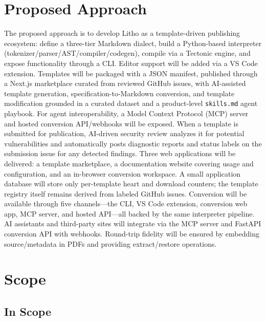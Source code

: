 \section{Proposed Approach}
The proposed approach is to develop Litho as a template-driven publishing ecosystem: define a three-tier Markdown dialect, build a Python-based interpreter (tokenizer/parser/AST/compiler/codegen), compile via a Tectonic engine, and expose functionality through a CLI. Editor support will be added via a VS Code extension. Templates will be packaged with a JSON manifest, published through a Next.js marketplace curated from reviewed GitHub issues, with AI-assisted template generation, specification-to-Markdown conversion, and template modification grounded in a curated dataset and a product-level \texttt{skills.md} agent playbook. For agent interoperability, a Model Context Protocol (MCP) server and hosted conversion API/webhooks will be exposed. When a template is submitted for publication, AI-driven security review analyzes it for potential vulnerabilities and automatically posts diagnostic reports and status labels on the submission issue for any detected findings. Three web applications will be delivered: a template marketplace, a documentation website covering usage and configuration, and an in-browser conversion workspace. A small application database will store only per-template heart and download counters; the template registry itself remains derived from labeled GitHub issues. Conversion will be available through five channels---the CLI, VS Code extension, conversion web app, MCP server, and hosted API---all backed by the same interpreter pipeline. AI assistants and third-party sites will integrate via the MCP server and FastAPI conversion API with webhooks. Round-trip fidelity will be ensured by embedding source/metadata in PDFs and providing extract/restore operations.

\section{Scope}
\subsection{In Scope}

